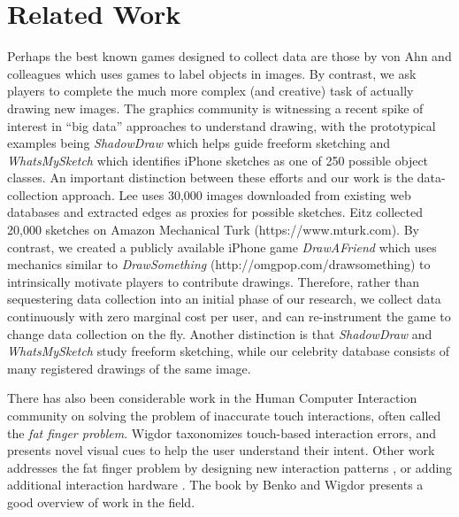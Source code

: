 \vspace{-0.1in}
\section{Related Work}
\vspace{-0.1in}
Perhaps the best known games designed to collect data are those by von Ahn and colleagues  which uses games to label objects in images. By contrast, we ask players to complete the much more complex (and creative) task of actually drawing new images. The graphics community is witnessing a recent spike of interest in ``big data'' approaches to understand drawing, with the prototypical examples being \emph{ShadowDraw} \cite{Lee:2011} which helps guide freeform sketching and \emph{WhatsMySketch} \cite{Eitz:2012:HSO} which identifies iPhone sketches as one of 250 possible object classes. An important distinction between these efforts and our work is the data-collection approach. Lee \etal uses 30,000 images downloaded from existing web databases and extracted edges as proxies for possible sketches. Eitz \etal collected 20,000 sketches on Amazon Mechanical Turk (https://www.mturk.com). By contrast, we created a publicly available iPhone game \emph{DrawAFriend} which uses mechanics similar to \emph{DrawSomething} (http://omgpop.com/drawsomething) to intrinsically motivate players to contribute drawings. Therefore, rather than sequestering data collection into an initial phase of our research, we collect data continuously with zero marginal cost per user, and can re-instrument the game to change data collection on the fly. Another distinction is that \emph{ShadowDraw} and \emph{WhatsMySketch} study freeform sketching, while our celebrity database consists of many registered drawings of the same image.

There has also been considerable work in the Human Computer Interaction community on solving the problem of inaccurate touch interactions, often called the \emph{fat finger problem}. Wigdor \etal {} taxonomizes touch-based interaction errors, and presents novel visual cues to help the user understand their intent. Other work addresses the fat finger problem by designing new interaction patterns \cite{Albinsson:2003:HPT,Benko:2006:PST,Forlines06hybridpointing,Vogel07shift:a}, or adding additional interaction hardware \cite{Scott:2010:RTE,Wigdor:2006:UTI,Wigdor:2007:LTS}. The book by Benko and Wigdor  presents a good overview of work in the field.

